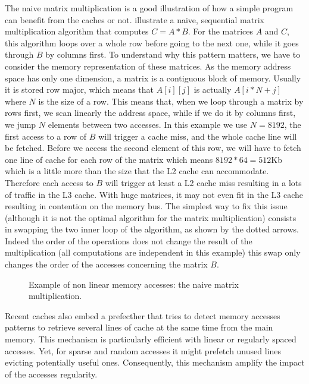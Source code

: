 The naive matrix multiplication is a good illustration of how a simple program can benefit from the caches or not.
 illustrate a naive, sequential matrix multiplication algorithm that computes $C=A*B$.
For the matrices $A$ and $C$, this algorithm loops over a whole row before going to the next one, while it goes through $B$ by columns first.
To understand why this pattern matters, we have to consider the memory representation of these matrices.
As the memory address space has only one dimension, a matrix is a contiguous block of memory.
Usually it is stored row major, which means that $A[i][j]$ is actually $A[i*N+j]$ where $N$ is the size of a row.
This means that, when we loop through a matrix by rows first, we scan linearly the address space, while if we do it by columns first, we jump $N$ elements between two accesses.
In this example we use $N=8192$, the first access to a row of $B$ will trigger a cache miss, and the whole cache line will be fetched.
Before we access the second element of this row, we will have to fetch one line of cache for each row of the matrix which means $8192*64=512$Kb which is a little more than the size that the L2 cache can accommodate.
Therefore each access to $B$ will trigger at least a L2 cache miss resulting in a lots of traffic in the L3 cache.
With huge matrices, it may not even fit in the L3 cache resulting in contention on the memory bus.
The simplest way to fix this issue (although it is not the optimal algorithm for the matrix multiplication) consists in swapping the two inner loop of the algorithm, as shown by the dotted arrows.
Indeed the order of the operations does not change the result of the multiplication (all computations are independent in this example) this swap only changes the order of the accesses concerning the matrix $B$.

\begin{figure}[htb]
    \centering
    
    \caption[Example of non linear memory accesses.]{Example of non linear memory accesses: the naive matrix multiplication.}
    \label{fig:mat-mult}
\end{figure}

Recent caches also embed a prefecther that tries to detect memory accesses patterns to retrieve several lines of cache at the same time from the main memory.
This mechanism is particularly efficient with linear or regularly spaced accesses.
Yet, for sparse and random accesses it might prefetch unused lines evicting potentially useful ones.
Consequently, this mechanism amplify the impact of the accesses regularity.

